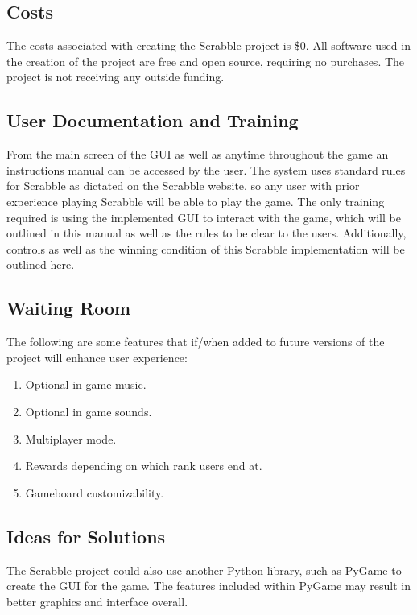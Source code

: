 \documentclass[12pt, titlepage]{article}
\begin{document}
\subsection{Costs}
The costs associated with creating the Scrabble project is \$0. All software used in the creation of the project are free and open source, requiring no purchases. The project is not receiving any outside funding.

\subsection{User Documentation and Training} %

From the main screen of the GUI as well as anytime throughout the game an instructions manual can be accessed by the user. The system uses standard rules for Scrabble as dictated on the Scrabble website, so any user with prior experience playing Scrabble will be able to play the game. The only training required is using the implemented GUI to interact with the game, which will be outlined in this manual as well as the rules to be clear to the users. Additionally, controls as well as the winning condition of this Scrabble implementation will be outlined here.

\subsection{Waiting Room} %

The following are some features that if/when added to future versions of the project will enhance user experience:
\begin{enumerate}
    \item Optional in game music.
    \item Optional in game sounds.
    \item Multiplayer mode.
    \item Rewards depending on which rank users end at.
    \item Gameboard customizability. 
\end{enumerate}

\subsection{Ideas for Solutions} %
The Scrabble project could also use another Python library, such as PyGame to create the GUI for the game. The features included within PyGame may result in better graphics and interface overall.
\end{document}
